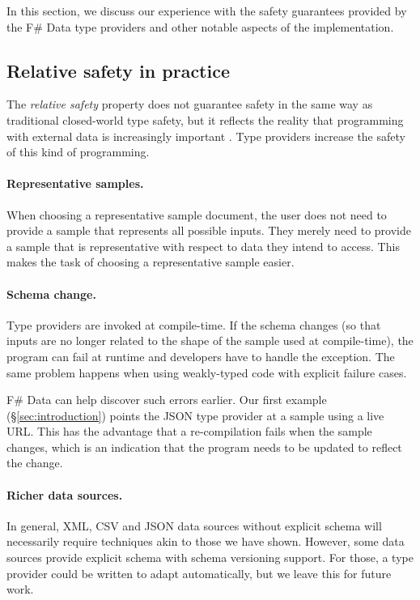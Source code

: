 \documentclass[10pt]{sigplanconf}
\begin{document}
In this section, we discuss our experience with the safety guarantees provided by the
F\# Data type providers and other notable aspects of the implementation.

\subsection{Relative safety in practice}
\label{sec:safety-discuss}

The \emph{relative safety} property does not guarantee safety in the same way as traditional
closed-world type safety, but it reflects the reality that programming with external data is
increasingly important \cite{age-of-web}. Type providers increase the safety of this kind of 
programming.

\paragraph{Representative samples.}
When choosing a representative sample document, the user does not need to provide a sample 
that represents all possible inputs. They merely need to provide a sample that is representative
with respect to data they intend to access. This makes the task of choosing a representative
sample easier.

\paragraph{Schema change.}
Type providers are invoked at compile-time. If the schema changes (so that inputs are no longer 
related to the shape of the sample used at compile-time), the program can fail at runtime and 
developers have to handle the exception. The same problem happens when using weakly-typed code 
with explicit failure cases.

F\# Data can help discover such errors earlier. Our first example (\S\ref{sec:introduction})
points the JSON type provider at a sample using a live URL. This has the advantage that a 
re-compilation fails when the sample changes, which is an indication that the program needs to be 
updated to reflect the change. 

\paragraph{Richer data sources.}
In general, XML, CSV and JSON data sources without explicit schema will necessarily require 
techniques akin to those we have shown. However, some data sources provide explicit schema with 
schema versioning support. For those, a type provider could be written to adapt automatically, 
but we leave this for future work.
\end{document}
